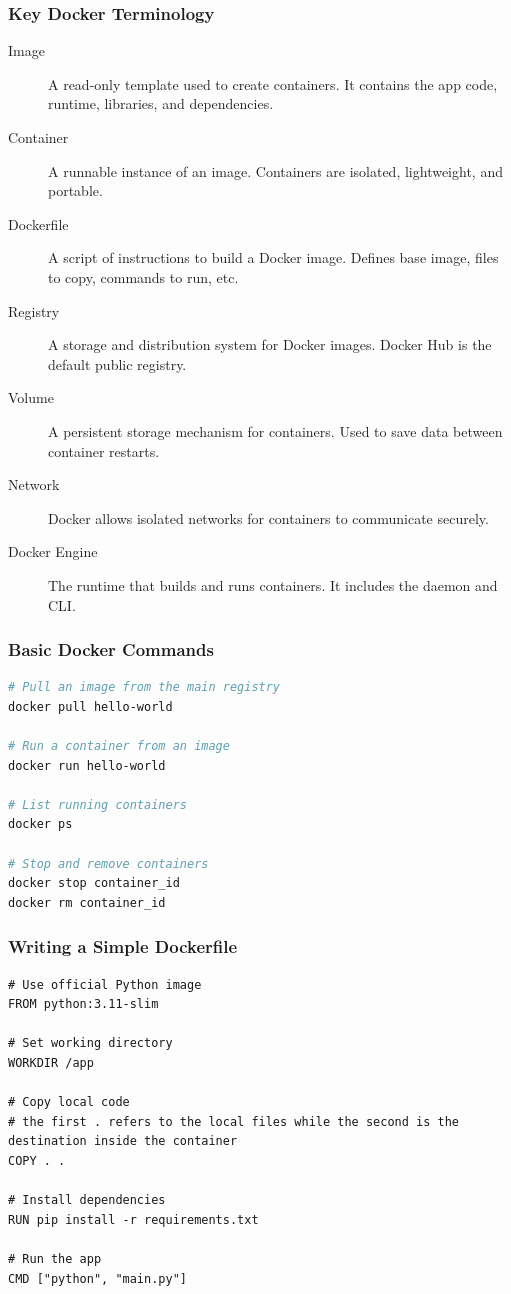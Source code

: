 \documentclass{beamer}
\begin{document}
\begin{frame}
\frametitle{Key Docker Terminology}
\begin{description}
  \item[Image] A read-only template used to create containers. It contains the app code, runtime, libraries, and dependencies.
  
  \item[Container] A runnable instance of an image. Containers are isolated, lightweight, and portable.

  \item[Dockerfile] A script of instructions to build a Docker image. Defines base image, files to copy, commands to run, etc.

  \item[Registry] A storage and distribution system for Docker images. Docker Hub is the default public registry.

  \item[Volume] A persistent storage mechanism for containers. Used to save data between container restarts.

  \item[Network] Docker allows isolated networks for containers to communicate securely.

  \item[Docker Engine] The runtime that builds and runs containers. It includes the daemon and CLI.

\end{description}
\end{frame}

\begin{frame}[fragile]
\frametitle{Basic Docker Commands}
\begin{lstlisting}[language=bash]
# Pull an image from the main registry
docker pull hello-world

# Run a container from an image
docker run hello-world

# List running containers
docker ps

# Stop and remove containers
docker stop container_id
docker rm container_id

\end{lstlisting}
\end{frame}

\begin{frame}[fragile]
\frametitle{Writing a Simple Dockerfile}
\begin{lstlisting}
# Use official Python image
FROM python:3.11-slim

# Set working directory
WORKDIR /app

# Copy local code
# the first . refers to the local files while the second is the destination inside the container
COPY . .

# Install dependencies
RUN pip install -r requirements.txt

# Run the app
CMD ["python", "main.py"]
\end{lstlisting}
\end{frame}
\end{document}

